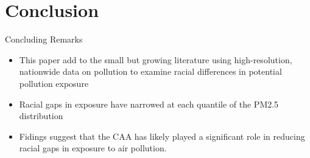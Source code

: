 \documentclass[dvipdfmx,12pt]{beamer}
\begin{document}
\section{Conclusion}
\frame{\sectionpage}
\begin{frame}{Concluding Remarks}
  \begin{itemize}
    \item This paper add to the small but growing literature using high-resolution, nationwide data on pollution to examine racial differences in potential pollution exposure
    \item Racial gaps in exposure have narrowed at each quantile of the PM2.5 distribution
    \item Fidings suggest that the CAA has likely played a significant role in reducing racial gaps in exposure to air pollution.
  \end{itemize}
\end{frame}
\end{document}
